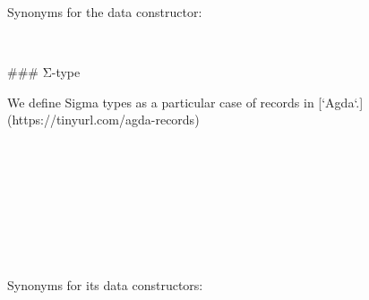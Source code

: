 Synonyms for the data constructor:
\begin{code}%
\>[0]\AgdaSpace{}%
\AgdaSymbol{:}\AgdaSpace{}%
\AgdaSpace{}%
\AgdaSymbol{\{}\AgdaSymbol{\}}\AgdaSpace{}%
\AgdaSpace{}%
\AgdaSpace{}%
\AgdaSymbol{\{}\AgdaSymbol{\}}\<%
\\
\>[0]\AgdaSpace{}%
\AgdaSymbol{=}\AgdaSpace{}%
\<%
\end{code}

### Σ-type

We define Sigma types as a particular case of records in [`Agda`.](https://tinyurl.com/agda-records)

\begin{code}%
\>[0]\AgdaSpace{}%
\AgdaSpace{}%
\AgdaOperator{\AgdaInductiveConstructor{\AgdaUnderscore{},\AgdaUnderscore{}}}\<%
\\
\>[0]\AgdaSpace{}%
\AgdaSpace{}%
\AgdaSymbol{\{}\AgdaSpace{}%
\AgdaSymbol{\}}\AgdaSpace{}%
\AgdaSymbol{(}\AgdaSpace{}%
\AgdaSymbol{:}\AgdaSpace{}%
\AgdaSpace{}%
\AgdaSymbol{)(}\AgdaSpace{}%
\AgdaSymbol{:}\AgdaSpace{}%
\AgdaSpace{}%
\AgdaSpace{}%
\AgdaSpace{}%
\AgdaSymbol{)}\AgdaSpace{}%
\AgdaSymbol{:}\AgdaSpace{}%
\AgdaSpace{}%
\AgdaSymbol{(}\AgdaSpace{}%
\AgdaSpace{}%
\AgdaSymbol{)}\AgdaSpace{}%
\<%
\\
\>[0][@{}l@{\AgdaIndent{0}}]%
\>[2]\AgdaSpace{}%
\AgdaOperator{\AgdaInductiveConstructor{\AgdaUnderscore{},\AgdaUnderscore{}}}\<%
\\
%
\>[2]\<%
\\
\>[2][@{}l@{\AgdaIndent{0}}]%
\>[4]\AgdaSpace{}%
\AgdaSymbol{:}\AgdaSpace{}%
\<%
\\
%
\>[4]\AgdaSpace{}%
\AgdaSymbol{:}\AgdaSpace{}%
\AgdaSpace{}%
\<%
\\
%
\\[\AgdaEmptyExtraSkip]%
\>[0]\AgdaSpace{}%
\AgdaSpace{}%
\<%
\end{code}

Synonyms for its data constructors:

